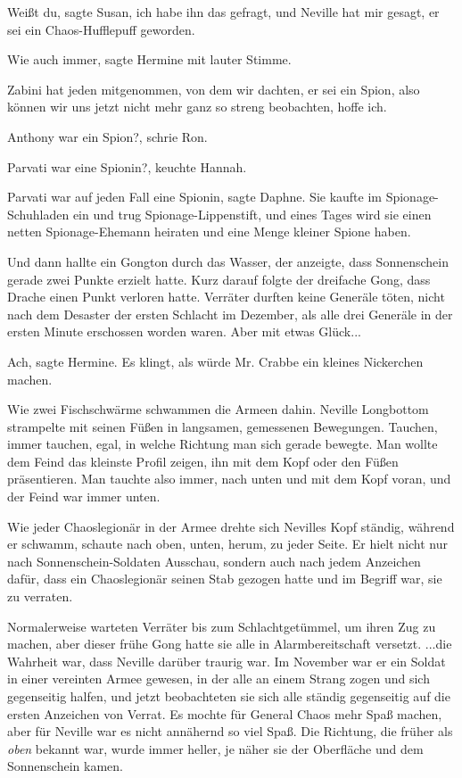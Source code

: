 \glqq{}Weißt du\grqq{}, sagte Susan, \glqq{}ich habe ihn das gefragt, und Neville
hat mir gesagt, er sei ein Chaos-Hufflepuff geworden.\grqq{}

\glqq{}Wie auch immer\grqq{}, sagte Hermine mit lauter Stimme.

\glqq{}Zabini hat jeden mitgenommen, von dem wir dachten, er sei ein Spion, also
können wir uns jetzt nicht mehr ganz so streng beobachten, hoffe ich.\grqq{}

\glqq{}Anthony war ein Spion?\grqq{}, schrie Ron.

\glqq{}Parvati war eine Spionin?\grqq{}, keuchte Hannah.

\glqq{}Parvati war auf jeden Fall eine Spionin\grqq{}, sagte Daphne. \glqq{}Sie
kaufte im Spionage-Schuhladen ein und trug Spionage-Lippenstift, und eines Tages
wird sie einen netten Spionage-Ehemann heiraten und eine Menge kleiner Spione
haben.\grqq{}

Und dann hallte ein Gongton durch das Wasser, der anzeigte, dass Sonnenschein
gerade zwei Punkte erzielt hatte. Kurz darauf folgte der dreifache Gong, dass
Drache einen Punkt verloren hatte. Verräter durften keine Generäle töten, nicht
nach dem Desaster der ersten Schlacht im Dezember, als alle drei Generäle in der
ersten Minute erschossen worden waren. Aber mit etwas Glück...

\glqq{}Ach\grqq{}, sagte Hermine. \glqq{}Es klingt, als würde Mr. Crabbe ein
kleines Nickerchen machen.\grqq{}

Wie zwei Fischschwärme schwammen die Armeen dahin. Neville Longbottom strampelte
mit seinen Füßen in langsamen, gemessenen Bewegungen. Tauchen, immer tauchen,
egal, in welche Richtung man sich gerade bewegte. Man wollte dem Feind das
kleinste Profil zeigen, ihn mit dem Kopf oder den Füßen präsentieren. Man
tauchte also immer, nach unten und mit dem Kopf voran, und der Feind war immer
unten.

Wie jeder Chaoslegionär in der Armee drehte sich Nevilles Kopf ständig, während
er schwamm, schaute nach oben, unten, herum, zu jeder Seite. Er hielt nicht nur
nach Sonnenschein-Soldaten Ausschau, sondern auch nach jedem Anzeichen dafür,
dass ein Chaoslegionär seinen Stab gezogen hatte und im Begriff war, sie zu
verraten.

Normalerweise warteten Verräter bis zum Schlachtgetümmel, um ihren Zug zu
machen, aber dieser frühe Gong hatte sie alle in Alarmbereitschaft versetzt.
...die Wahrheit war, dass Neville darüber traurig war. Im November war er ein
Soldat in einer vereinten Armee gewesen, in der alle an einem Strang zogen und
sich gegenseitig halfen, und jetzt beobachteten sie sich alle ständig
gegenseitig auf die ersten Anzeichen von Verrat. Es mochte für General Chaos
mehr Spaß machen, aber für Neville war es nicht annähernd so viel Spaß. Die
Richtung, die früher als \emph{\glqq{}oben\grqq{}} bekannt war, wurde immer
heller, je näher sie der Oberfläche und dem Sonnenschein kamen.


